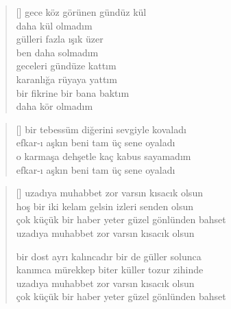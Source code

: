 \documentclass[10pt, openright, twoside]{memoir}
\theoremstyle{definition}
\begin{document}
\vspace*{\fill}
\settowidth{\versewidth}{gece köz görünen gündüz kül}
\begin{verse}[\versewidth]
  gece köz görünen gündüz kül \\
  daha kül olmadım \\
  gülleri fazla ışık üzer \\
  ben daha solmadım \\
  geceleri gündüze kattım \\
  karanlığa rüyaya yattım \\
  bir fikrine bir bana baktım \\
  daha kör olmadım \\
\end{verse}
\vspace*{\fill}
%
\newpage
{}
\vspace*{\fill}
\settowidth{\versewidth}{bir tebessüm diğerini sevgiyle kovaladı}
\begin{verse}[\versewidth]
  bir tebessüm diğerini sevgiyle kovaladı \\
  efkar-ı aşkın beni tam üç sene oyaladı \\
  o karmaşa dehşetle kaç kabus sayamadım \\
  efkar-ı aşkın beni tam üç sene oyaladı \\
\end{verse}
\vspace*{\fill}
%
\newpage
{}
\vspace*{\fill}
\settowidth{\versewidth}{çok küçük bir haber yeter güzel gönlünden bahset}
\begin{verse}[\versewidth]
  uzadıya muhabbet zor varsın kısacık olsun \\
  hoş bir iki kelam gelsin izleri senden olsun \\
  çok küçük bir haber yeter güzel gönlünden bahset \\
  uzadıya muhabbet zor varsın kısacık olsun

  bir dost ayrı kalıncadır bir de güller solunca \\
  kanımca mürekkep biter küller tozur zihinde \\
  uzadıya muhabbet zor varsın kısacık olsun \\
  çok küçük bir haber yeter güzel gönlünden bahset \\
\end{verse}
\end{document}
